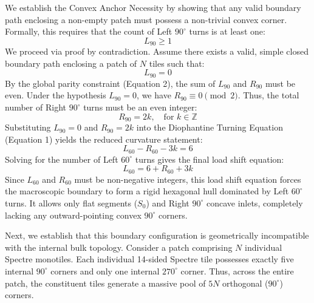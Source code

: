 \documentclass[11pt, a4paper]{amsart}
\begin{document}
We establish the Convex Anchor Necessity by showing that any valid boundary path enclosing a non-empty patch must possess a non-trivial convex corner. Formally, this requires that the count of Left $90^\circ$ turns is at least one:
\begin{equation}
L_{90} \ge 1
\end{equation}
We proceed via proof by contradiction. Assume there exists a valid, simple closed boundary path enclosing a patch of $N$ tiles such that:
\begin{equation}
L_{90} = 0
\end{equation}
By the global parity constraint (Equation 2), the sum of $L_{90}$ and $R_{90}$ must be even. Under the hypothesis $L_{90} = 0$, we have $R_{90} \equiv 0 \pmod 2$. Thus, the total number of Right $90^\circ$ turns must be an even integer:
\begin{equation}
R_{90} = 2k, \quad \text{for } k \in \mathbb{Z}
\end{equation}
Substituting $L_{90} = 0$ and $R_{90} = 2k$ into the Diophantine Turning Equation (Equation 1) yields the reduced curvature statement:
\begin{equation}
L_{60} - R_{60} - 3k = 6
\end{equation}
Solving for the number of Left $60^\circ$ turns gives the final load shift equation:
\begin{equation}
L_{60} = 6 + R_{60} + 3k
\end{equation}
Since $L_{60}$ and $R_{60}$ must be non-negative integers, this load shift equation forces the macroscopic boundary to form a rigid hexagonal hull dominated by Left $60^\circ$ turns. It allows only flat segments ($S_0$) and Right $90^\circ$ concave inlets, completely lacking any outward-pointing convex $90^\circ$ corners.

Next, we establish that this boundary configuration is geometrically incompatible with the internal bulk topology. Consider a patch comprising $N$ individual Spectre monotiles. Each individual 14-sided Spectre tile possesses exactly five internal $90^\circ$ corners and only one internal $270^\circ$ corner. Thus, across the entire patch, the constituent tiles generate a massive pool of $5N$ orthogonal ($90^\circ$) corners. 
\end{document}
